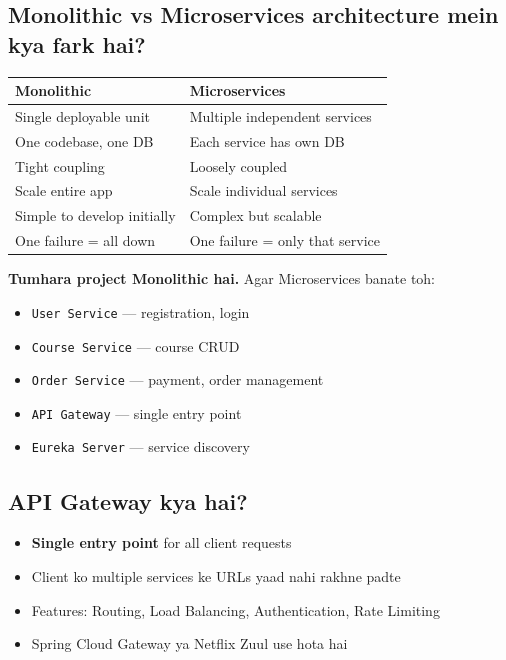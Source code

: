 \documentclass[12pt,a4paper]{article}
\begin{document}
\setcounter{subsection}{84}

\subsection{Monolithic vs Microservices architecture mein kya fark hai?}

\begin{answerbox}
\begin{center}
\begin{tabular}{p{6cm} p{6cm}}
\toprule
\textbf{Monolithic} & \textbf{Microservices} \\
\midrule
Single deployable unit & Multiple independent services \\
One codebase, one DB & Each service has own DB \\
Tight coupling & Loosely coupled \\
Scale entire app & Scale individual services \\
Simple to develop initially & Complex but scalable \\
One failure = all down & One failure = only that service \\
\bottomrule
\end{tabular}
\end{center}
\textbf{Tumhara project Monolithic hai.} Agar Microservices banate toh:
\begin{itemize}
    \item \texttt{User Service} --- registration, login
    \item \texttt{Course Service} --- course CRUD
    \item \texttt{Order Service} --- payment, order management
    \item \texttt{API Gateway} --- single entry point
    \item \texttt{Eureka Server} --- service discovery
\end{itemize}
\end{answerbox}

\subsection{API Gateway kya hai?}

\begin{answerbox}
\begin{itemize}
    \item \textbf{Single entry point} for all client requests
    \item Client ko multiple services ke URLs yaad nahi rakhne padte
    \item Features: Routing, Load Balancing, Authentication, Rate Limiting
    \item Spring Cloud Gateway ya Netflix Zuul use hota hai
\end{itemize}
\end{answerbox}
\end{document}
